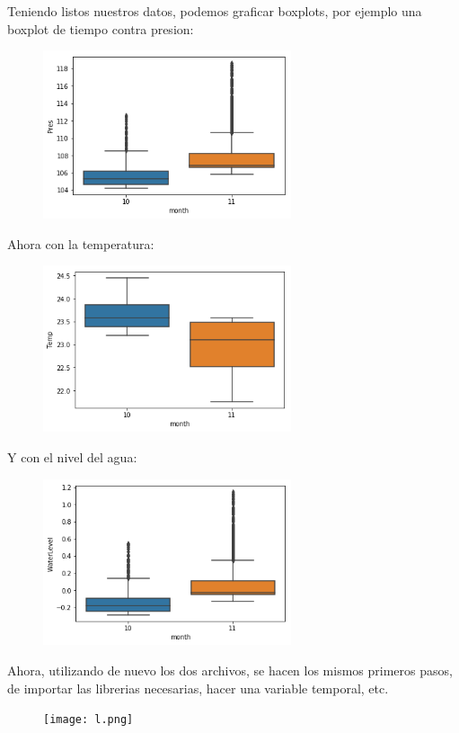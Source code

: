 \documentclass{article}
\begin{document}
Teniendo listos nuestros datos, podemos graficar boxplots, por ejemplo una boxplot de tiempo contra presion:
\begin{figure}[h]
\centering
\includegraphics[width=0.65\textwidth]{30.png}
\end{figure}

Ahora con la temperatura:
\begin{figure}[h]
\centering
\includegraphics[width=0.65\textwidth]{31.png}
\end{figure}
\newpage
Y con el nivel del agua:
\begin{figure}[h]
\centering
\includegraphics[width=0.65\textwidth]{32.png}
\end{figure}

Ahora, utilizando de nuevo los dos archivos, se hacen los mismos primeros pasos, de importar las librerias necesarias, hacer una variable temporal, etc.
\begin{figure}[h]
\centering
\texttt{[image: l.png]}
\end{figure}
\end{document}

